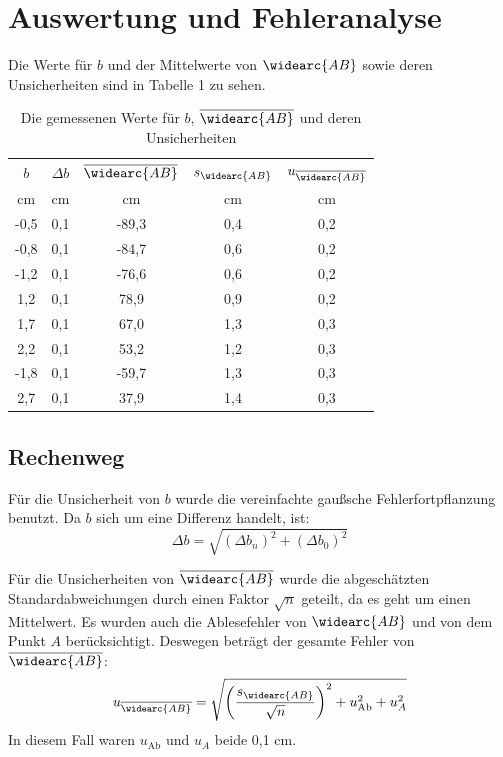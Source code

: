 \documentclass[11pt,a4paper]{article}
\begin{document}
\section{Auswertung und Fehleranalyse}

Die Werte für $b$ und der Mittelwerte von $\widearc{AB}$ sowie deren Unsicherheiten sind in Tabelle 1 zu sehen.


\begin{table}[h]
	\centering
	\begin{tabular*}{0.50\textwidth}{@{\extracolsep{\fill}}ccccc}
		\toprule
		$b$ & $\Delta b$ & $\overline{\widearc{AB}}$ & $s_{\widearc{AB}}$ & $u_{\overline{\widearc{AB}}}$ \\
		cm & cm & cm &cm& cm\\
		\midrule
		-0,5 & 0,1 & -89,3 & 0,4 & 0,2\\
		-0,8 & 0,1 & -84,7 &0,6& 0,2\\
		-1,2 & 0,1 & -76,6 &0,6& 0,2\\
		1,2 & 0,1& 78,9 &0,9& 0,2 \\
		1,7 & 0,1 & 67,0 &1,3& 0,3 \\
		2,2 & 0,1 & 53,2 &1,2& 0,3 \\
		-1,8 & 0,1 & -59,7 &1,3& 0,3 \\
		2,7 & 0,1 & 37,9 &1,4& 0,3\\
		\bottomrule
\end{tabular*}
\caption{Die gemessenen Werte für $b$, $\overline{\widearc{AB}}$ und deren Unsicherheiten}
\end{table}

\begin{tcolorbox}[colback=white]
\subsection{Rechenweg}
Für die Unsicherheit von $b$ wurde die vereinfachte gaußsche Fehlerfortpflanzung benutzt. Da $b$ sich um eine Differenz handelt, ist:
$$\Delta b = \sqrt{(\Delta b_n)^2 + (\Delta b_0)^2}$$

Für die Unsicherheiten von $\overline{\widearc{AB}}$ wurde die abgeschätzten Standardabweichungen durch einen Faktor $\sqrt{n}$ geteilt, da es geht um einen Mittelwert. Es wurden auch die Ablesefehler von $\widearc{AB}$ und von dem Punkt $A$ berücksichtigt. Deswegen beträgt der gesamte Fehler von $\overline{\widearc{AB}}$:
$$
u_{\overline{\widearc{AB}}} = \sqrt{\left(\frac{s_{\widearc{AB}}}{\sqrt{n}}\right)^2+u_\textrm{Ab}^2+u_A^2}
$$
In diesem Fall waren $u_\textrm{Ab}$ und $u_A$ beide 0,1 cm.
\end{tcolorbox}
\end{document}
